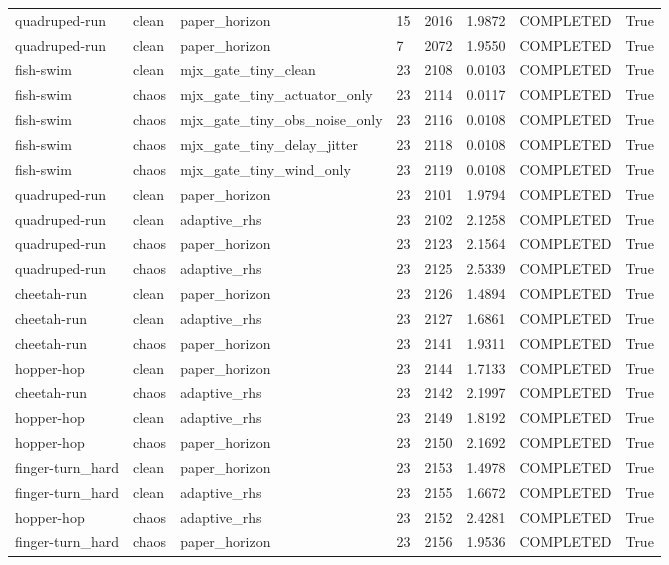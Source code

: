 \begin{tabular}{llllllll}
quadruped-run & clean & paper\_horizon & 15 & 2016 & 1.9872 & COMPLETED & True \\
quadruped-run & clean & paper\_horizon & 7 & 2072 & 1.9550 & COMPLETED & True \\
fish-swim & clean & mjx\_gate\_tiny\_clean & 23 & 2108 & 0.0103 & COMPLETED & True \\
fish-swim & chaos & mjx\_gate\_tiny\_actuator\_only & 23 & 2114 & 0.0117 & COMPLETED & True \\
fish-swim & chaos & mjx\_gate\_tiny\_obs\_noise\_only & 23 & 2116 & 0.0108 & COMPLETED & True \\
fish-swim & chaos & mjx\_gate\_tiny\_delay\_jitter & 23 & 2118 & 0.0108 & COMPLETED & True \\
fish-swim & chaos & mjx\_gate\_tiny\_wind\_only & 23 & 2119 & 0.0108 & COMPLETED & True \\
quadruped-run & clean & paper\_horizon & 23 & 2101 & 1.9794 & COMPLETED & True \\
quadruped-run & clean & adaptive\_rhs & 23 & 2102 & 2.1258 & COMPLETED & True \\
quadruped-run & chaos & paper\_horizon & 23 & 2123 & 2.1564 & COMPLETED & True \\
quadruped-run & chaos & adaptive\_rhs & 23 & 2125 & 2.5339 & COMPLETED & True \\
cheetah-run & clean & paper\_horizon & 23 & 2126 & 1.4894 & COMPLETED & True \\
cheetah-run & clean & adaptive\_rhs & 23 & 2127 & 1.6861 & COMPLETED & True \\
cheetah-run & chaos & paper\_horizon & 23 & 2141 & 1.9311 & COMPLETED & True \\
hopper-hop & clean & paper\_horizon & 23 & 2144 & 1.7133 & COMPLETED & True \\
cheetah-run & chaos & adaptive\_rhs & 23 & 2142 & 2.1997 & COMPLETED & True \\
hopper-hop & clean & adaptive\_rhs & 23 & 2149 & 1.8192 & COMPLETED & True \\
hopper-hop & chaos & paper\_horizon & 23 & 2150 & 2.1692 & COMPLETED & True \\
finger-turn\_hard & clean & paper\_horizon & 23 & 2153 & 1.4978 & COMPLETED & True \\
finger-turn\_hard & clean & adaptive\_rhs & 23 & 2155 & 1.6672 & COMPLETED & True \\
hopper-hop & chaos & adaptive\_rhs & 23 & 2152 & 2.4281 & COMPLETED & True \\
finger-turn\_hard & chaos & paper\_horizon & 23 & 2156 & 1.9536 & COMPLETED & True \\

\end{tabular}
